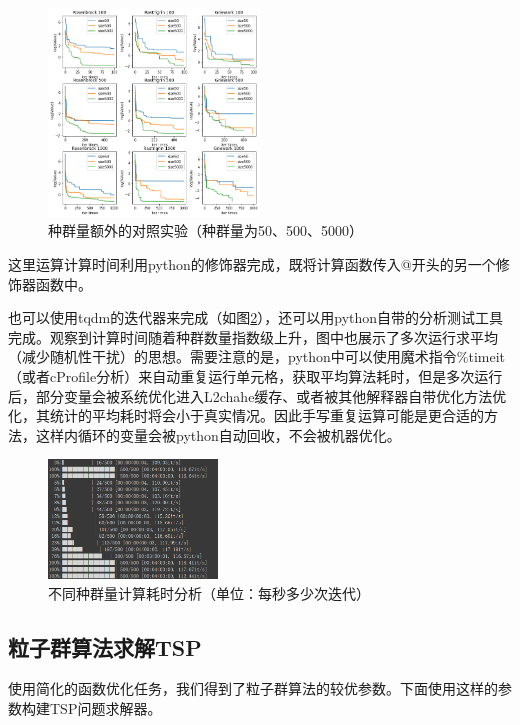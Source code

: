 \documentclass[lang=cn,11pt]{elegantpaper}
\begin{document}
\begin{figure}[h!]
  \centering
  \includegraphics[width=0.5\textwidth]{figure/PSO/种群量额外的对照实验（种群量为50、500、5000）.png} %
  \caption{种群量额外的对照实验（种群量为50、500、5000）} %
  \label{img:种群量额外的对照实验}
\end{figure}

这里运算计算时间利用python的修饰器完成，既将计算函数传入@开头的另一个修饰器函数中。

也可以使用tqdm的迭代器来完成（如图\ref{img:不同种群量计算耗时分析}），还可以用python自带的分析测试工具完成。观察到计算时间随着种群数量指数级上升，图中也展示了多次运行求平均（减少随机性干扰）的思想。需要注意的是，python中可以使用魔术指令\%timeit（或者cProfile分析）来自动重复运行单元格，获取平均算法耗时，但是多次运行后，部分变量会被系统优化进入L2chahe缓存、或者被其他解释器自带优化方法优化，其统计的平均耗时将会小于真实情况。因此手写重复运算可能是更合适的方法，这样内循环的变量会被python自动回收，不会被机器优化。

\begin{figure}[h!t]
  \centering
  \includegraphics[width=0.4\textwidth]{figure/PSO/提前停止位置（W从0.05增加到1）.png} %
  \caption{不同种群量计算耗时分析（单位：每秒多少次迭代）} %
  \label{img:不同种群量计算耗时分析}
\end{figure}

\subsection{粒子群算法求解TSP}
使用简化的函数优化任务，我们得到了粒子群算法的较优参数。下面使用这样的参数构建TSP问题求解器。
\end{document}
